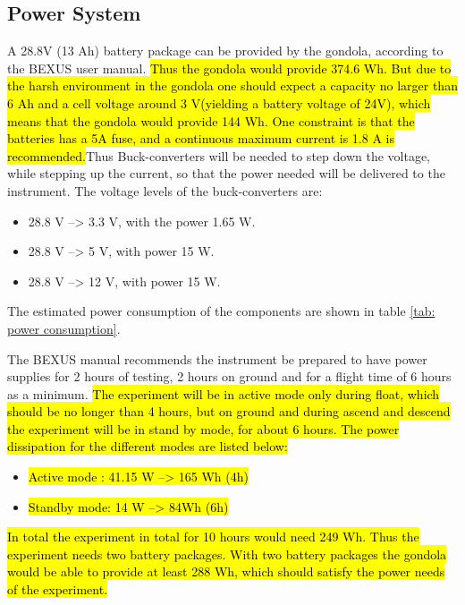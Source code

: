 \pagebreak
\subsection{Power System}

\label{sec:4.7}

A 28.8V (13 Ah) battery package can be provided by the gondola, according to the BEXUS user manual. \hl{Thus the gondola would provide 374.6 Wh. But due to the harsh environment in the gondola one should expect a capacity no larger than 6 Ah and a cell voltage around 3 V(yielding a battery voltage of 24V), which means that the gondola would provide 144 Wh. One constraint is that the batteries has a 5A fuse, and a continuous maximum current is 1.8 A is recommended.}Thus Buck-converters will be needed to step down the voltage, while stepping up the current, so that the power needed will be delivered to the instrument. The voltage levels of the buck-converters are:

\begin{itemize}
	\item 28.8 V --> 3.3 V, with the power 1.65 W.
	\item 28.8 V --> 5 V, with power 15 W.
	\item 28.8 V --> 12 V, with power 15 W.
\end{itemize}


The estimated power consumption of the components are shown in table \ref{tab: power consumption}.




The BEXUS manual recommends the instrument be prepared to have power supplies for 2 hours of testing, 2 hours on ground and for a flight time of 6 hours as a minimum. \hl{The experiment will be in active mode only during float, which should be no longer than 4 hours, but on ground and during ascend and descend the experiment will be in stand by mode, for about 6 hours. The power dissipation for the different modes are listed below:}


\begin{itemize}
    \item \hl{Active mode : 41.15 W --> 165 Wh (4h) }
    \item \hl{Standby mode: 14 W --> 84Wh (6h)}
\end{itemize}

\hl{In total the experiment in total for 10 hours would need 249 Wh. Thus the experiment needs two battery packages. With two battery packages the gondola would be able to provide at least 288 Wh, which should satisfy the power needs of the experiment. }



\raggedbottom
